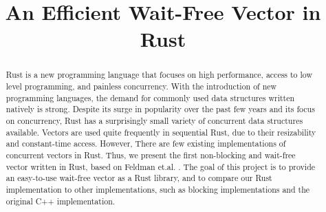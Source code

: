 \documentclass[conference]{IEEEtran}
\begin{document}
\title{An Efficient Wait-Free Vector in Rust}

\author{
\and
{}
\and
{}
\and
{}
}

\maketitle

\begin{abstract}

Rust is a new programming language that focuses on high performance, access to low level programming, and painless concurrency. With the introduction of new programming languages, the demand for commonly used data structures written natively is strong. Despite its surge in popularity over the past few years and its focus on concurrency, Rust has a surprisingly small variety of concurrent data structures available. Vectors are used quite frequently in sequential Rust, due to their resizability and constant-time access. However, There are few existing implementations of concurrent vectors in Rust. Thus, we present the first non-blocking and wait-free vector written in Rust, based on Feldman et.al. \cite{main}. The goal of this project is to provide an easy-to-use wait-free vector as a Rust library, and to compare our Rust implementation to other implementations, such as blocking implementations and the original C++ implementation.

\end{abstract}
\end{document}
